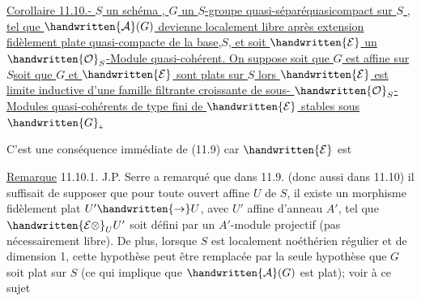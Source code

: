 \uline{Corollaire 11.10.-  $S$ un  schéma , $G$ un $S$-groupe quasi-séparéquasicompact sur $S$ , tel que $\handwritten{\mathcal{A}}(G)$ devienne  localement libre après extension fidèlement plate quasi-compacte de la base,$S$, et soit $\handwritten{\mathcal{E}}$ un $\handwritten{\mathcal{O}}_S$-Module quasi-cohérent. On suppose soit que $G$ est affine sur $S$\handwritten{,}soit que $G$ et $\handwritten{\mathcal{E}}$ sont plats sur $S$ lors $\handwritten{\mathcal{E}}$ est limite inductive d'une famille filtrante croissante de sous- $\handwritten{\mathcal{O}}_S$-Modules quasi-cohérents de type fini de $\handwritten{\mathcal{E}}$ stables sous $\handwritten{G}$.}

C'est une conséquence immédiate de (11.9) car $\handwritten{\mathcal{E}}$ est 

\uline{Remarque} 11.10.1. J.P. Serre a remarqué que dans 11.9. (donc aussi dans 11.10) il suffisait de supposer que pour toute ouvert affine $U$ de $S$, il existe un morphisme fidèlement plat $U'\handwritten{\to}U$, avec $U'$ affine d'anneau $A'$, tel que $\handwritten{\mathcal{E}\otimes}_U U'$ soit défini par un $A'$-module projectif (pas nécessairement libre). De plus, lorsque $S$ est localement noéthérien régulier et de dimension 1, cette hypothèse peut être remplacée par la seule hypothèse que $G$ soit plat sur $S$ (ce qui implique que $\handwritten{\mathcal{A}}(G)$ est plat); voir à ce sujet  


